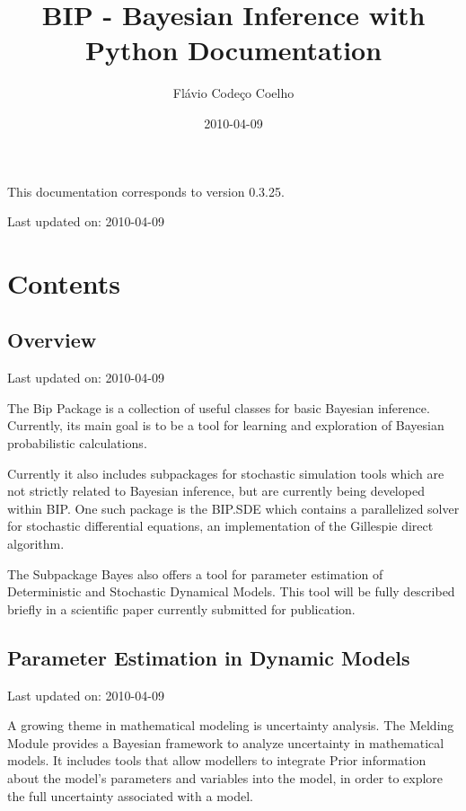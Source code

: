 \documentclass[a4paper,10pt,english]{manual}
\title{BIP - Bayesian Inference with Python Documentation}
\date{2010-04-09}
\author{Flávio Codeço Coelho}
\begin{document}
\maketitle
\tableofcontents
\hypertarget{--doc-index}{}


This documentation corresponds to version 0.3.25.

Last updated on: 2010-04-09


\chapter{Contents}

\resetcurrentobjects
\hypertarget{--doc-overview}{}

\section{Overview}

Last updated on: 2010-04-09

The Bip Package is a collection of useful classes for basic Bayesian inference. Currently, its main goal is to be a tool for learning and exploration of Bayesian probabilistic calculations.

Currently it also includes subpackages for stochastic simulation tools which are not strictly related to Bayesian inference, but are currently being developed within BIP. One such package is the BIP.SDE which contains a parallelized solver for stochastic differential equations, an implementation of the Gillespie direct algorithm.

The Subpackage Bayes also offers a tool for parameter estimation of Deterministic and Stochastic Dynamical Models. This tool will be fully described briefly in a scientific paper currently submitted for publication.

\resetcurrentobjects
\hypertarget{--doc-paramest}{}

\section{Parameter Estimation in Dynamic Models}

Last updated on: 2010-04-09

A growing theme in mathematical modeling is uncertainty analysis. The Melding Module provides a Bayesian framework to analyze uncertainty in mathematical models. It includes tools that allow modellers to integrate Prior information about the model's parameters and variables into the model, in order to explore the full uncertainty associated with a model.
\end{document}
